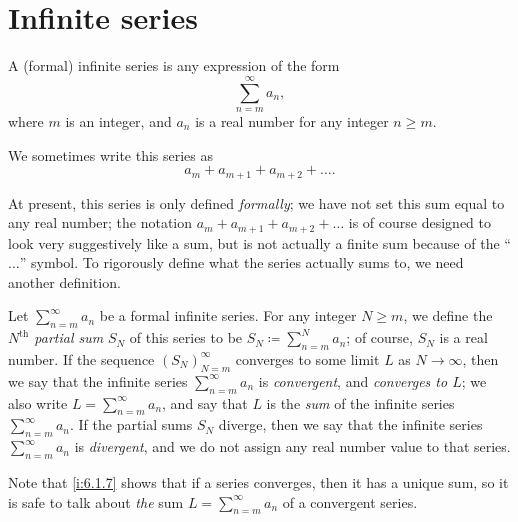 \section{Infinite series}\label{i:sec:7.2}

\begin{defn}\label{i:7.2.1}
  A (formal) infinite series is any expression of the form
  \[
    \sum_{n = m}^\infty a_n,
  \]
  where \(m\) is an integer, and \(a_n\) is a real number for any integer \(n \geq m\).
\end{defn}

\begin{note}
  We sometimes write this series as
  \[
    a_m + a_{m + 1} + a_{m + 2} + \dots.
  \]
\end{note}

\begin{note}
  At present, this series is only defined \emph{formally};
  we have not set this sum equal to any real number;
  the notation \(a_m + a_{m + 1} + a_{m + 2} + \dots\) is of course designed to look very suggestively like a sum, but is not actually a finite sum because of the ``\(\dots\)'' symbol.
  To rigorously define what the series actually sums to, we need another definition.
\end{note}

\begin{defn}\label{i:7.2.2}
  Let \(\sum_{n = m}^\infty a_n\) be a formal infinite series.
  For any integer \(N \geq m\), we define the \emph{\(N^{\text{th}}\) partial sum} \(S_N\) of this series to be \(S_N \coloneqq \sum_{n = m}^N a_n\);
  of course, \(S_N\) is a real number.
  If the sequence \((S_N)_{N = m}^\infty\) converges to some limit \(L\) as \(N \to \infty\), then we say that the infinite series \(\sum_{n = m}^\infty a_n\) is \emph{convergent}, and \emph{converges to \(L\)};
  we also write \(L = \sum_{n = m}^\infty a_n\), and say that \(L\) is the \emph{sum} of the infinite series \(\sum_{n = m}^\infty a_n\).
  If the partial sums \(S_N\) diverge, then we say that the infinite series \(\sum_{n = m}^\infty a_n\) is \emph{divergent}, and we do not assign any real number value to that series.
\end{defn}

\begin{rmk}\label{i:7.2.3}
  Note that \cref{i:6.1.7} shows that if a series converges, then it has a unique sum, so it is safe to talk about \emph{the} sum \(L = \sum_{n = m}^\infty a_n\) of a convergent series.
\end{rmk}

